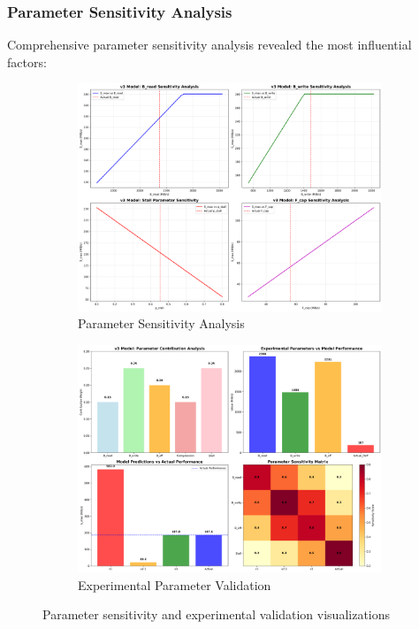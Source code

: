 \documentclass[11pt,twocolumn]{article}
\begin{document}
\subsubsection{Parameter Sensitivity Analysis}
Comprehensive parameter sensitivity analysis revealed the most influential factors:

\begin{figure}[H]
\centering
\begin{subfigure}{0.48\textwidth}
\centering
\includegraphics[width=\textwidth]{experiments/2025-09-05/v3_parameter_sensitivity_analysis.png}
\caption{Parameter Sensitivity Analysis}
\label{fig:parameter_sensitivity}
\end{subfigure}
\hfill
\begin{subfigure}{0.48\textwidth}
\centering
\includegraphics[width=\textwidth]{experiments/2025-09-05/experimental_parameter_validation.png}
\caption{Experimental Parameter Validation}
\label{fig:experimental_validation}
\end{subfigure}
\caption{Parameter sensitivity and experimental validation visualizations}
\end{figure}
\end{document}
